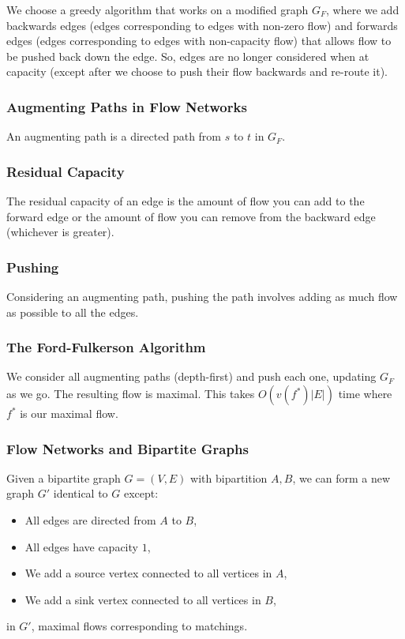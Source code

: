 We choose a greedy algorithm that works on a modified graph $G_F$, where we add backwards edges
(edges corresponding to edges with non-zero flow) 
and forwards edges 
(edges corresponding to edges with non-capacity flow) 
that allows flow to be pushed back down the edge. So, edges are no longer considered when 
at capacity (except after we choose to push their flow backwards and re-route it).

\subsubsection{Augmenting Paths in Flow Networks}

An augmenting path is a directed path from $s$ to $t$ in $G_F$.

\subsubsection{Residual Capacity}

The residual capacity of an edge is the amount of flow you can add to the forward edge or
the amount of flow you can remove from the backward edge (whichever is greater).

\subsubsection{Pushing}

Considering an augmenting path, pushing the path involves adding as much flow as possible to
all the edges.

\subsubsection{The Ford-Fulkerson Algorithm}

We consider all augmenting paths (depth-first) and push each one, updating $G_F$ as we go. 
The resulting flow is maximal. This takes $O(v(f^*)|E|)$ time where $f^*$ is our maximal flow.

\subsubsection{Flow Networks and Bipartite Graphs}

Given a bipartite graph $G = (V, E)$ with bipartition $A, B$, we can form a new graph
$G'$ identical to $G$ except: \begin{itemize}
  \item All edges are directed from $A$ to $B$,
  \item All edges have capacity $1$,
  \item We add a source vertex connected to all vertices in $A$,
  \item We add a sink vertex connected to all vertices in $B$,
\end{itemize} in $G'$, maximal flows corresponding to matchings.

